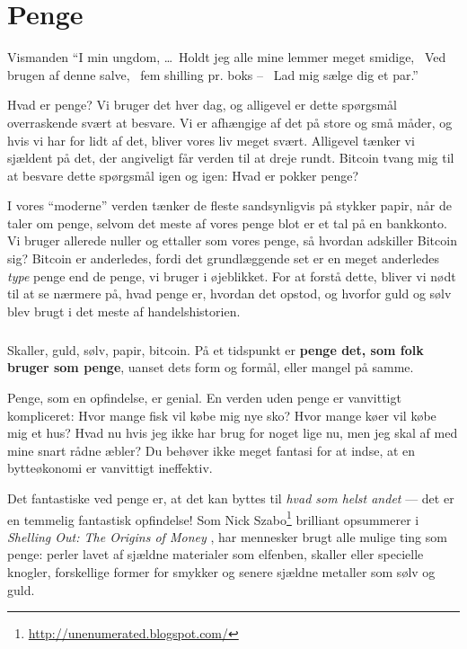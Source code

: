 \chapter{Penge}
\label{les:11}

\begin{chapquote}{Vismanden}
\enquote{I min ungdom, \ldots \
Holdt jeg alle mine lemmer meget smidige, \
Ved brugen af denne salve, \
fem shilling pr. boks -- \
Lad mig sælge dig et par.}
\end{chapquote}

Hvad er penge? Vi bruger det hver dag, og alligevel er dette spørgsmål overraskende svært at besvare. Vi er afhængige af det på store og små måder, og hvis vi har for lidt af det, bliver vores liv meget svært. Alligevel tænker vi sjældent på det, der angiveligt får verden til at dreje rundt. Bitcoin tvang mig til at besvare dette spørgsmål igen og igen: Hvad er pokker penge?

I vores \enquote{moderne} verden tænker de fleste sandsynligvis på stykker papir, når de taler om penge, selvom det meste af vores penge blot er et tal på en bankkonto. Vi bruger allerede nuller og ettaller som vores penge, så hvordan adskiller Bitcoin sig? Bitcoin er anderledes, fordi det grundlæggende set er en meget anderledes \textit{type} penge end de penge, vi bruger i øjeblikket. For at forstå dette, bliver vi nødt til at se nærmere på, hvad penge er, hvordan det opstod, og hvorfor guld og sølv blev brugt i det meste af handelshistorien.

\paragraph{}
Skaller, guld, sølv, papir, bitcoin. På et tidspunkt er \textbf{penge det, som folk bruger som penge}, uanset dets form og formål, eller mangel på samme.

Penge, som en opfindelse, er genial. En verden uden penge er vanvittigt kompliceret: Hvor mange fisk vil købe mig nye sko? Hvor mange køer vil købe mig et hus? Hvad nu hvis jeg ikke har brug for noget lige nu, men jeg skal af med mine snart rådne æbler? Du behøver ikke meget fantasi for at indse, at en bytteøkonomi er vanvittigt ineffektiv.

Det fantastiske ved penge er, at det kan byttes til \textit{hvad som helst andet} --- det er en temmelig fantastisk opfindelse! Som Nick Szabo\footnote{\url{http://unenumerated.blogspot.com/}} brilliant opsummerer i \textit{Shelling Out: The Origins of Money} \cite{shelling-out}, har mennesker brugt alle mulige ting som penge: perler lavet af sjældne materialer som elfenben, skaller eller specielle knogler, forskellige former for smykker og senere sjældne metaller som sølv og guld.

